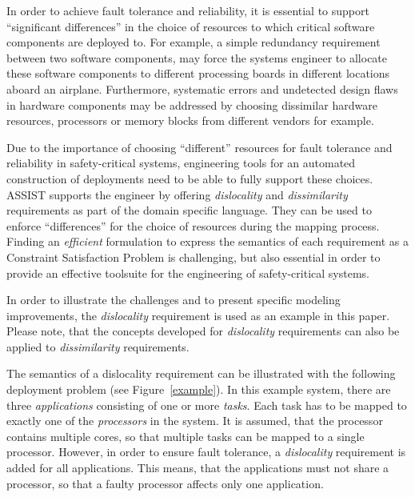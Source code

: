 \documentclass[conference]{IEEEtran}
\begin{document}
In order to achieve fault tolerance and reliability, it is essential to support ``significant differences'' in the choice of resources to which critical software components are deployed to.
For example, a simple redundancy requirement between two software components, may force the systems engineer to allocate these software components to different processing boards in different locations aboard an airplane.
Furthermore, systematic errors and undetected design flaws in hardware components may be addressed by choosing dissimilar hardware resources, processors or memory blocks from different vendors for example.

Due to the importance of choosing  ``different'' resources for fault tolerance and reliability in safety-critical systems, engineering tools for an automated construction of deployments need to be able to fully support these choices.
ASSIST supports the engineer by offering \emph{dislocality} and \emph{dissimilarity} requirements as part of the domain specific language.
They can be used to enforce ``differences'' for the choice of resources during the mapping process.
Finding an \emph{efficient} formulation to express the semantics of each requirement as a Constraint Satisfaction Problem is challenging, but also essential in order to provide an effective toolsuite for the engineering of safety-critical systems.

In order to illustrate the challenges and to present specific modeling improvements, the \emph{dislocality} requirement is used as an example in this paper.
Please note, that the concepts developed for \emph{dislocality} requirements can also be applied to \emph{dissimilarity} requirements.

The semantics of a dislocality requirement can be illustrated with the following deployment problem (see Figure~\ref{example}).
In this example system, there are three \emph{applications} consisting of one or more \emph{tasks}.
Each task has to be mapped to exactly one of the \emph{processors} in the system.
It is assumed, that the processor contains multiple cores, so that multiple tasks can be mapped to a single processor.
However, in order to ensure fault tolerance, a \emph{dislocality} requirement is added for all applications.
This means, that the applications must not share a processor, so that a faulty processor affects only one application.
\end{document}
